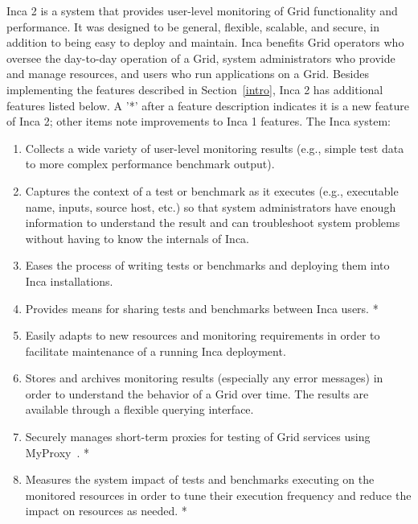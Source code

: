 \documentclass[times,10pt,twocolumn]{article}
\begin{document}
Inca 2 is a system that provides user-level monitoring of Grid functionality
and performance.  It was designed to be
general, flexible, scalable, and secure, in addition to being easy to deploy
and maintain.  Inca benefits Grid operators who oversee the day-to-day
operation of a Grid, system administrators who provide and manage resources,
and users who run applications on a Grid.  Besides implementing the features
described in Section~\ref{intro}, Inca 2 has additional features
listed below.  A '*' after a feature description indicates it is a new
feature of Inca 2; other items note improvements to Inca 1 features.  The 
Inca system:

\begin{enumerate}

\item Collects a wide variety of user-level monitoring results (e.g., simple
test data to more complex performance benchmark output).  

\item Captures the context of a test or benchmark as it executes (e.g.,
executable name, inputs, source host, etc.) so that system administrators have
enough information to understand the result and can troubleshoot system
problems without having to know the internals of Inca. 

\item Eases the process of writing tests or benchmarks and deploying them into
Inca installations. 

\item Provides means for sharing tests and benchmarks between Inca users. *

\item Easily adapts to new resources and monitoring requirements in order to
facilitate maintenance of a running Inca deployment. 

\item Stores and archives monitoring results (especially any error messages) 
in order to understand the behavior of a Grid over time. The results
are available through a flexible querying interface.

\item Securely manages short-term proxies for testing of Grid services using
MyProxy~\cite{myproxy}. *

\item Measures the system impact of tests and benchmarks executing on
the monitored resources in order to tune their execution frequency and
reduce the impact on resources as needed. *

\end{enumerate}
\end{document}
